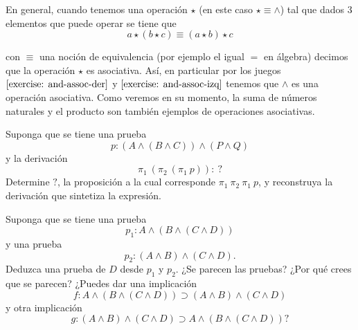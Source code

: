 \documentclass{article}
\begin{document}
\begin{remark}
    En general, cuando tenemos una operación $\star$ (en este caso $\star \equiv \land$)
    tal que dados 3 elementos que puede operar se tiene que
    $$
        a \star(b \star c) \equiv (a \star b) \star c
    $$

    con $\equiv$ una noción de equivalencia (por ejemplo el igual $=$ en álgebra)
    decimos que la operación $\star$ es asociativa. Así, en particular por los juegos
    $\ref{exercise: and-assoc-der}$ y $\ref{exercise: and-assoc-izq}$ tenemos que $\land$ es
    una operación asociativa. Como veremos en su momento, la suma de números naturales
    y el producto son también ejemplos de operaciones asociativas.
\end{remark}

\begin{exercise}
    Suponga que se tiene una prueba 
    $$p : (A \wedge (B \wedge C)) \wedge (P \wedge Q)$$ 
    y la derivación
    $$
        \pi_1\ (\pi_2\ (\pi_1\ p)) :\ ?
    $$
    Determine $?$, la proposición a la cual corresponde $\pi_1\ \pi_2\ \pi_1\ p$,
    y reconstruya la derivación que sintetiza la expresión.

\end{exercise}

\begin{exercise}
    Suponga que se tiene una prueba 
    $$p_1 : A \wedge (B \wedge (C \wedge D))$$
    y una prueba 
    $$p_2 : (A \wedge B) \wedge (C \wedge D).$$ 
    Deduzca una prueba de $D$ desde $p_1$ y $p_2$. ¿Se parecen las pruebas? 
    ¿Por qué crees que se parecen?
    ¿Puedes dar una implicación 
    $$f : A \wedge (B \wedge (C \wedge D)) \supset (A \wedge B) \wedge (C \wedge D)$$ 
    y otra
    implicación 
    $$g : (A \wedge B) \wedge (C \wedge D) \supset A \wedge (B \wedge (C \wedge D))?$$
\end{exercise}
\end{document}
